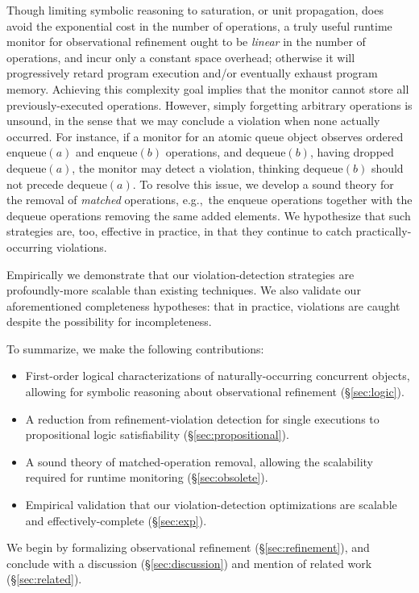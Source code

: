 Though limiting symbolic reasoning to saturation, or unit propagation, does
avoid the exponential cost in the number of operations, a truly useful runtime
monitor for observational refinement ought to be \emph{linear} in the number of
operations, and incur only a constant space overhead; otherwise it will
progressively retard program execution and/or eventually exhaust program
memory. Achieving this complexity goal implies that the monitor cannot store
all previously-executed operations. However, simply forgetting arbitrary
operations is unsound, in the sense that we may conclude a violation when none
actually occurred. For instance, if a monitor for an atomic queue object
observes ordered enqueue$(a)$ and enqueue$(b)$ operations, and dequeue$(b)$,
having dropped dequeue$(a)$, the monitor may detect a violation, thinking
dequeue$(b)$ should not precede dequeue$(a)$. To resolve this issue, we develop
a sound theory for the removal of \emph{matched} operations, e.g.,~the enqueue
operations together with the dequeue operations removing the same added
elements. We hypothesize that such strategies are, too, effective in practice,
in that they continue to catch practically-occurring violations.

Empirically we demonstrate that our violation-detection strategies are
profoundly-more scalable than existing techniques. We also validate our
aforementioned completeness hypotheses: that in practice, violations are
caught despite the possibility for incompleteness.

To summarize, we make the following contributions:
\begin{itemize}

  \item First-order logical characterizations of naturally-occurring concurrent
  objects, allowing for symbolic reasoning about observational refinement
  (\S\ref{sec:logic}).

  \item A reduction from refinement-violation detection for single executions
  to propositional logic satisfiability (\S\ref{sec:propositional}).
  
  \item A sound theory of matched-operation removal, allowing the scalability
  required for runtime monitoring (\S\ref{sec:obsolete}).
  
  \item Empirical validation that our violation-detection optimizations are
  scalable and effectively-complete (\S\ref{sec:exp}).

\end{itemize}
We begin by formalizing observational refinement (\S\ref{sec:refinement}), and
conclude with a discussion (\S\ref{sec:discussion}) and mention of related work
(\S\ref{sec:related}).
